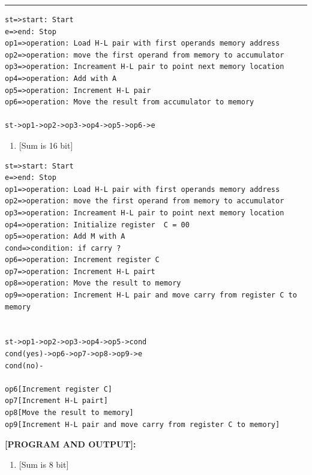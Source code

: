 \documentclass[11pt,twocolumn]{article}
\begin{document}
\begin{center}\rule{0.5\linewidth}{0.5pt}\end{center}

\begin{verbatim}
st=>start: Start
e=>end: Stop
op1=>operation: Load H-L pair with first operands memory address
op2=>operation: move the first operand from memory to accumulator
op3=>operation: Increament H-L pair to point next memory location
op4=>operation: Add with A
op5=>operation: Increment H-L pair
op6=>operation: Move the result from accumulator to memory

st->op1->op2->op3->op4->op5->op6->e
\end{verbatim}

\begin{enumerate}
\def\labelenumi{\alph{enumi})}
\setcounter{enumi}{1}
\tightlist
\item
  {[}Sum is 16 bit{]}
\end{enumerate}

\begin{verbatim}
st=>start: Start
e=>end: Stop
op1=>operation: Load H-L pair with first operands memory address
op2=>operation: move the first operand from memory to accumulator
op3=>operation: Increament H-L pair to point next memory location
op4=>operation: Initialize register  C = 00
op5=>operation: Add M with A
cond=>condition: if carry ?
op6=>operation: Increment register C
op7=>operation: Increment H-L pairt
op8=>operation: Move the result to memory
op9=>operation: Increment H-L pair and move carry from register C to memory


st->op1->op2->op3->op4->op5->cond
cond(yes)->op6->op7->op8->op9->e
cond(no)-

op6[Increment register C]
op7[Increment H-L pairt]
op8[Move the result to memory]
op9[Increment H-L pair and move carry from register C to memory]
\end{verbatim}

\textbf{{[}PROGRAM AND OUTPUT{]}:}

\begin{enumerate}
\def\labelenumi{\alph{enumi})}
\tightlist
\item
  {[}Sum is 8 bit{]}
\end{enumerate}
\end{document}
